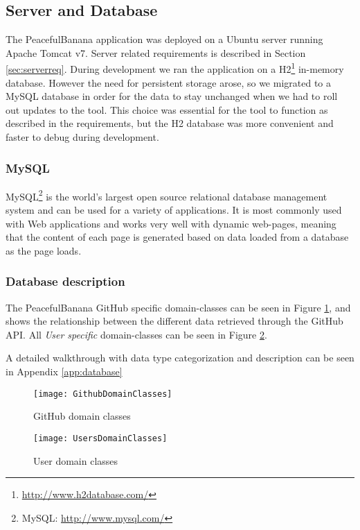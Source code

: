\subsection{Server and Database}
\label{sec:database}
The PeacefulBanana application was deployed on a Ubuntu server running Apache Tomcat v7. Server related requirements is described in Section \ref{sec:serverreq}.  
During development we ran the application on a H2\footnote{\url{http://www.h2database.com/}} in-memory database. However the need for persistent storage arose, so we migrated to a MySQL database in order for the data to stay unchanged when we had to roll out updates to the tool. This choice was essential for the tool to function as described in the requirements, but the H2 database was more convenient and faster to debug during development.
\subsubsection{MySQL}
MySQL\footnote{MySQL: \url{http://www.mysql.com/}} is the world's largest open source relational database management system and can be used for a variety of applications. It is most commonly used with Web applications and works very well with dynamic web-pages, meaning that the content of each page is generated based on data loaded from a database as the page loads.

\subsubsection{Database description}
The PeacefulBanana GitHub specific domain-classes can be seen in Figure \ref{GithubDomainClasses}, and shows the relationship between the different data retrieved through the GitHub API. 
All \emph{User specific} domain-classes can be seen in Figure \ref{UsersDomainClasses}.

A detailed walkthrough with data type categorization and description can be seen in Appendix \ref{app:database}
\begin{figure}[H]
    \centering
        \texttt{[image: GithubDomainClasses]}
    \caption{GitHub domain classes}
    \label{GithubDomainClasses}
\end{figure}
\begin{figure}[H]
    \centering
        \texttt{[image: UsersDomainClasses]}
    \caption{User domain classes}
    \label{UsersDomainClasses}
\end{figure}
